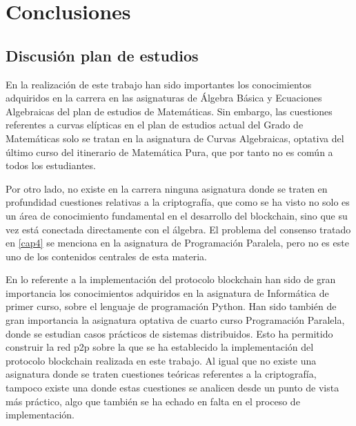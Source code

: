 \cleardoublepage

\chapter{Conclusiones}\label{conclusiones}
\section{Discusión plan de estudios}
En la realización de este trabajo han sido importantes los conocimientos adquiridos en la carrera en las asignaturas de Álgebra Básica y Ecuaciones Algebraicas del plan de estudios de Matemáticas. Sin embargo, las cuestiones referentes a curvas elípticas en el plan de estudios actual del Grado de Matemáticas solo se tratan en la asignatura de Curvas Algebraicas, optativa del último curso del itinerario de Matemática Pura, que por tanto no es común a todos los estudiantes. 

Por otro lado, no existe en la carrera ninguna asignatura donde se traten en profundidad cuestiones relativas a la criptografía, que como se ha visto no solo es un área de conocimiento fundamental en el desarrollo del blockchain, sino que su vez está conectada directamente con el álgebra.
El problema del consenso tratado en \ref{cap4} se menciona en la asignatura de Programación Paralela, pero no es este uno de los contenidos centrales de esta materia.

En lo referente a la implementación del protocolo blockchain han sido de gran importancia los conocimientos adquiridos en la asignatura de Informática de primer curso, sobre el lenguaje de programación Python. Han sido también de gran importancia la asignatura optativa de cuarto curso Programación Paralela, donde se estudian casos prácticos de sistemas distribuidos. Esto ha permitido construir la red p2p sobre la que se ha establecido la  implementación del protocolo blockchain realizada en este trabajo. Al igual que no existe una asignatura donde se traten cuestiones teóricas referentes a la criptografía, tampoco existe una donde estas cuestiones se analicen desde un punto de vista más práctico, algo que también se ha echado en falta en el proceso de implementación.  
